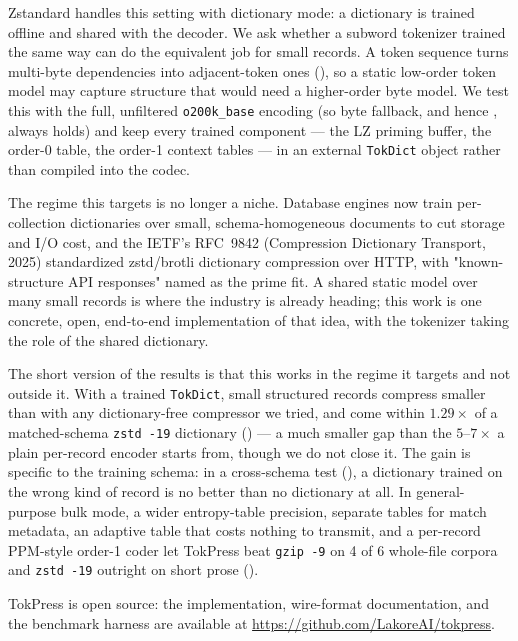 \documentclass[10pt,twocolumn]{article}
\theoremstyle{plain}
\theoremstyle{definition}
\begin{document}
Zstandard handles this setting with dictionary mode: a dictionary is trained offline
and shared with the decoder. We ask whether a subword tokenizer trained the same way
can do the equivalent job for small records. A token sequence turns multi-byte
dependencies into adjacent-token ones (), so a static low-order token
model may capture structure that would need a higher-order byte model. We test this
with the full, unfiltered \texttt{o200k\_base} encoding (so byte fallback, and hence
, always holds) and keep every trained component --- the LZ priming
buffer, the order-0 table, the order-1 context tables --- in an external
\texttt{TokDict} object rather than compiled into the codec.

The regime this targets is no longer a niche. Database engines now train per-collection
dictionaries over small, schema-homogeneous documents to cut storage and I/O cost, and
the IETF's RFC~9842 (Compression Dictionary Transport, 2025) standardized zstd/brotli
dictionary compression over HTTP, with "known-structure API responses" named as the
prime fit. A shared static model over many small records is where the industry is
already heading; this work is one concrete, open, end-to-end implementation of that
idea, with the tokenizer taking the role of the shared dictionary.

The short version of the results is that this works in the regime it targets and not
outside it. With a trained \texttt{TokDict}, small structured records compress
smaller than with any dictionary-free compressor we tried, and come within
$1.29\times$ of a matched-schema \texttt{zstd -19} dictionary
() --- a much smaller gap than the $5$--$7\times$ a plain
per-record encoder starts from, though we do not close it. The gain is specific to
the training schema: in a cross-schema test (), a dictionary
trained on the wrong kind of record is no better than no dictionary at all. In
general-purpose bulk mode, a wider entropy-table precision, separate tables for match
metadata, an adaptive table that costs nothing to transmit, and a per-record
PPM-style order-1 coder let TokPress beat \texttt{gzip -9} on 4 of 6 whole-file
 corpora and \texttt{zstd -19} outright on short prose ().

TokPress is open source: the implementation, wire-format documentation, and the
benchmark harness are available at \url{https://github.com/LakoreAI/tokpress}.
\end{document}
